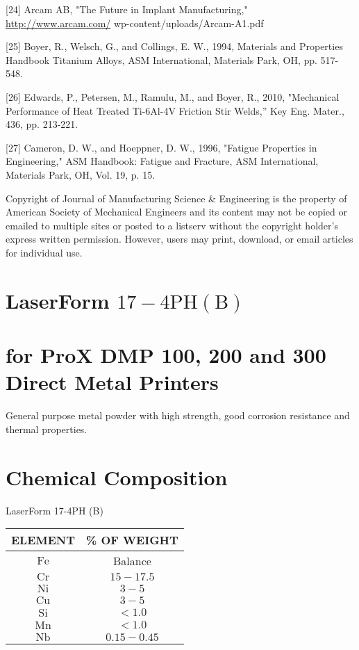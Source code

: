 \documentclass[10pt]{article}
\begin{document}
[24] Arcam AB, "The Future in Implant Manufacturing," \href{http://www.arcam.com/}{http://www.arcam.com/} wp-content/uploads/Arcam-A1.pdf

[25] Boyer, R., Welsch, G., and Collings, E. W., 1994, Materials and Properties Handbook Titanium Alloys, ASM International, Materials Park, OH, pp. 517-548.

[26] Edwards, P., Petersen, M., Ramulu, M., and Boyer, R., 2010, "Mechanical Performance of Heat Treated Ti-6Al-4V Friction Stir Welds,” Key Eng. Mater., 436, pp. 213-221.

[27] Cameron, D. W., and Hoeppner, D. W., 1996, "Fatigue Properties in Engineering," ASM Handbook: Fatigue and Fracture, ASM International, Materials Park, OH, Vol. 19, p. 15.

Copyright of Journal of Manufacturing Science \& Engineering is the property of American Society of Mechanical Engineers and its content may not be copied or emailed to multiple sites or posted to a listserv without the copyright holder's express written permission. However, users may print, download, or email articles for individual use.

\section*{LaserForm $17-4 \mathrm{PH}(\mathrm{B})$}
\section*{for ProX DMP 100, 200 and 300 Direct Metal Printers}
General purpose metal powder with high strength, good corrosion resistance and thermal properties.

\section*{Chemical Composition}
LaserForm 17-4PH (B)

\begin{center}
\begin{tabular}{|c|c|}
\hline
ELEMENT & \% OF WEIGHT \\
\hline
$\mathrm{Fe}$ & Balance \\
\hline
$\mathrm{Cr}$ & $15-17.5$ \\
\hline
$\mathrm{Ni}$ & $3-5$ \\
\hline
$\mathrm{Cu}$ & $3-5$ \\
\hline
$\mathrm{Si}$ & $<1.0$ \\
\hline
$\mathrm{Mn}$ & $<1.0$ \\
\hline
$\mathrm{Nb}$ & $0.15-0.45$ \\
\hline
\end{tabular}
\end{center}
\end{document}
